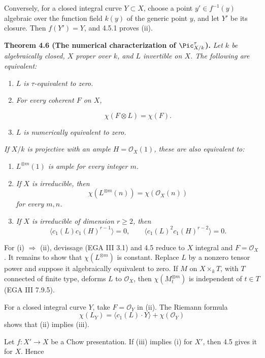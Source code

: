 Conversely, for a closed integral curve \(Y\subset X\), choose a point
\(y'\in f^{-1}(y)\) algebraic over the function field \(k(y)\) of the
generic point \(y\), and let \(Y'\) be its closure. Then \(f(Y')=Y\), and
4.5.1 proves (ii).

\textbf{Theorem 4.6 (The numerical characterization of
\(\Pic^\tau_{X/k}\)).} \emph{Let \(k\) be algebraically closed, \(X\)
proper over \(k\), and \(L\) invertible on \(X\). The following are
equivalent:}
\begin{enumerate}[label=(\roman*)]
\item \emph{\(L\) is \(\tau\)-equivalent to zero.}
\item \emph{For every coherent \(F\) on \(X\),}

\[
\chi(F\otimes L)=\chi(F).
\]
\item \emph{\(L\) is numerically equivalent to zero.}
\end{enumerate}
\emph{If \(X/k\) is projective with an ample
\(H=\mathcal O_X(1)\), these are also equivalent to:}
\begin{enumerate}[label=(\roman*),start=4]
\item \emph{\(L^{\otimes m}(1)\) is ample for every integer \(m\).}
\item \emph{If \(X\) is irreducible, then
\[
\chi(L^{\otimes m}(n))=\chi(\mathcal O_X(n))
\]
for every \(m,n\).}
\item \emph{If \(X\) is irreducible of dimension \(r\ge2\), then
\[
\langle c_1(L)c_1(H)^{r-1}\rangle=0,\qquad
\langle c_1(L)^2c_1(H)^{r-2}\rangle=0.
\]}
\end{enumerate}

For (i) \(\Rightarrow\) (ii), devissage (EGA III 3.1) and 4.5 reduce to
\(X\) integral and \(F=\mathcal O_X\). It remains to show that
\(\chi(L^{\otimes m})\) is constant. Replace \(L\) by a nonzero tensor
power and suppose it algebraically equivalent to zero. If \(M\) on
\(X\times_kT\), with \(T\) connected of finite type, deforms \(L\) to
\(\mathcal O_X\), then \(\chi(M_t^{\otimes m})\) is independent of
\(t\in T\) (EGA III 7.9.5).

For a closed integral curve \(Y\), take \(F=\mathcal O_Y\) in (ii).
The Riemann formula
\[
\chi(L_Y)=\langle c_1(L)\cdot Y\rangle+\chi(\mathcal O_Y)
\]
shows that (ii) implies (iii).

Let \(f:X'\to X\) be a Chow presentation. If (iii) implies (i) for
\(X'\), then 4.5 gives it for \(X\). Hence

